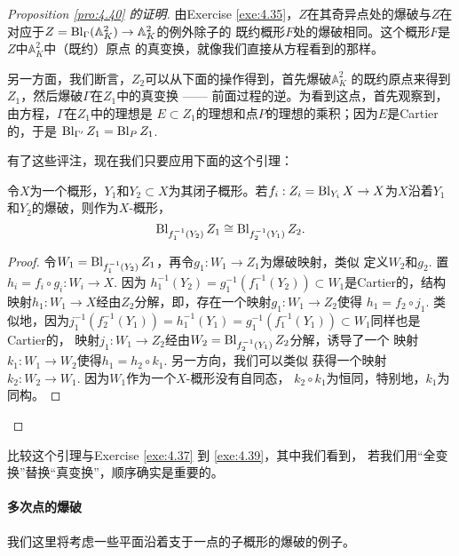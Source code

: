 \begin{proof}[Proposition \ref{pro:4.40} 的证明]
由Exercise \ref{exe:4.35}，$Z$在其奇异点处的爆破与$Z$在
对应于$Z=\operatorname{Bl}_\Gamma (\mathbb A_K^2)\to \mathbb A_K^2$的例外除子的
既约概形$F$处的爆破相同。这个概形$F$是$Z$中$\mathbb A_K^2$中（既约）原点
的真变换，就像我们直接从方程看到的那样。

另一方面，我们断言，$Z_2$可以从下面的操作得到，首先爆破$\mathbb A_K^2$
的既约原点来得到$Z_1$，然后爆破$\Gamma$在$Z_1$中的真变换 ------
前面过程的逆。为看到这点，首先观察到，由方程，$\Gamma$在$Z_1$中的理想是
$E\subset Z_1$的理想和点$P$的理想的乘积；因为$E$是Cartier的，于是
$\operatorname{Bl}_{\Gamma'}Z_1=\operatorname{Bl}_P Z_1$.

有了这些评注，现在我们只要应用下面的这个引理：

\begin{lem}\label{lem:4.41}
	令$X$为一个概形，$Y_1$和$Y_2\subset X$为其闭子概形。若$f_i:Z_i=\operatorname{Bl}_{Y_i}X\to X$为$X$沿着$Y_1$和$Y_2$的爆破，则作为$X$-概形，
	\[
		\operatorname{Bl}_{f_1^{-1}(Y_2)}Z_1 \cong \operatorname{Bl}_{f_2^{-1}(Y_1)}Z_2.
	\]
\end{lem}

\begin{proof}
令$W_1=\operatorname{Bl}_{f_1^{-1}(Y_2)}Z_1$，再令$g_1:W_1\to Z_1$为爆破映射，类似
定义$W_2$和$g_2$. 置$h_i=f_i\circ g_i:W_i\to X$. 因为
$h_1^{-1}(Y_2)=g_1^{-1}(f_1^{-1}(Y_2))\subset W_1$是Cartier的，结构
映射$h_1:W_1\to X$经由$Z_2$分解，即，存在一个映射$g_1:W_1\to Z_2$使得
$h_1=f_2\circ j_1$. 类似地，因为$j_1^{-1}(f_2^{-1}(Y_1))=
h_1^{-1}(Y_1)=g_1^{-1}(f_1^{-1}(Y_1))\subset W_1$同样也是Cartier的，
映射$j_1:W_1\to Z_2$经由$W_2=\operatorname{Bl}_{f_2^{-1}(Y_1)}Z_2$分解，诱导了一个
映射$k_1:W_1\to W_2$使得$h_1=h_2\circ k_1$. 另一方向，我们可以类似
获得一个映射$k_2:W_2\to W_1$. 因为$W_1$作为一个$X$-概形没有自同态，
$k_2\circ k_1$为恒同，特别地，$k_1$为同构。
\renewcommand{\qedsymbol}{}
\end{proof}

\renewcommand{\qedsymbol}{$\square\hspace{-1.9ex}\square$}
\end{proof}\renewcommand{\qedsymbol}{$\square$}

比较这个引理与Exercise \ref{exe:4.37} 到 \ref{exe:4.39}，其中我们看到，
若我们用“全变换”替换“真变换”，顺序确实是重要的。

\paragraph*{多次点的爆破}
我们这里将考虑一些平面沿着支于一点的子概形的爆破的例子。

